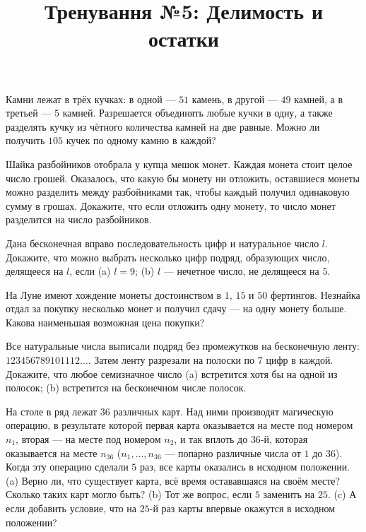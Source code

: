 



\title{Тренування №5: Делимость и остатки}
\maketitle

\begin{problem}
	Камни лежат в трёх кучках: в одной --- $51$ камень, в другой --- $49$ камней, а в третьей --- $5$ камней. Разрешается объединять любые кучки в одну, а также разделять кучку из чётного количества камней на две равные. Можно ли получить $105$ кучек по одному камню в каждой?
\end{problem}

\begin{problem}
	Шайка разбойников отобрала у купца мешок монет. Каждая монета стоит целое число грошей. Оказалось, что какую бы монету ни отложить, оставшиеся монеты можно разделить между разбойниками так, чтобы каждый получил одинаковую сумму в грошах. Докажите, что если отложить одну монету, то число монет разделится на число разбойников.
\end{problem}

\begin{problem}
	Дана бесконечная вправо последовательность цифр и натуральное число $l$. Докажите, что можно выбрать несколько цифр подряд, образующих число, делящееся на $l$, если (a) $l = 9$; (b) $l$ --- нечетное число, не делящееся на $5$.
\end{problem}

\begin{problem}
	На Луне имеют хождение монеты достоинством в $1$, $15$ и $50$ фертингов. Незнайка отдал за покупку несколько монет и получил сдачу --- на одну монету больше. Какова наименьшая возможная цена покупки?
\end{problem}

\begin{problem}
	Все натуральные числа выписали подряд без промежутков на бесконечную ленту: $123456789101112\ldots$. Затем ленту разрезали на полоски по $7$ цифр в каждой. Докажите, что любое семизначное число (a) встретится хотя бы на одной из полосок; (b) встретится на бесконечном числе полосок.
\end{problem}

\begin{problem}
	На столе в ряд лежат $36$ различных карт. Над ними производят магическую операцию, в результате которой первая карта оказывается на месте под номером $n_1$, вторая --- на месте под номером $n_2$, и так вплоть до $36$-й, которая оказывается на месте $n_{36}$ ($n_1, \ldots, n_{36}$ --- попарно различные числа от $1$ до $36$). Когда эту операцию сделали $5$ раз, все карты оказались в исходном положении. (a) Верно ли, что существует карта, всё время остававшаяся на своём месте? Сколько таких карт могло быть? (b) Тот же вопрос, если $5$ заменить на $25$. (c) А если добавить условие, что на $25$-й раз карты впервые окажутся в исходном положении?
\end{problem}

